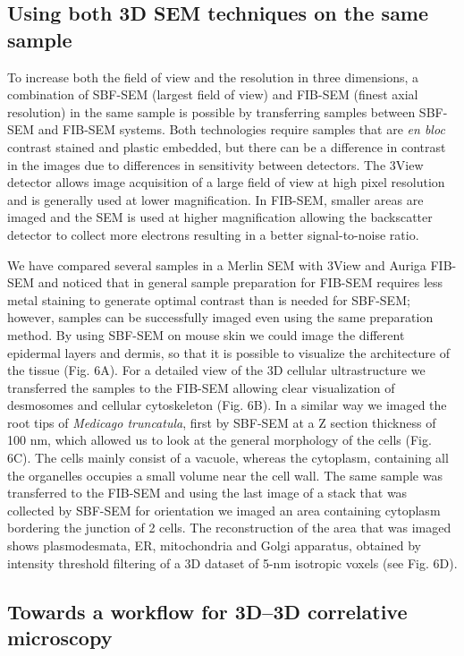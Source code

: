 \documentclass{article}
\begin{document}
\subsection*{Using both 3D SEM techniques on the same sample}

To increase both the field of view and the resolution in three dimensions, a combination of SBF-SEM (largest field of view) and FIB-SEM (finest axial resolution) in the same sample is possible by transferring samples between SBF-SEM and FIB-SEM systems. Both technologies require samples that are \textit{en bloc} contrast stained and plastic embedded, but there can be a difference in contrast in the images due to differences in sensitivity between detectors. The 3View detector allows image acquisition of a large field of view at high pixel resolution and is generally used at lower magnification. In FIB-SEM, smaller areas are imaged and the SEM is used at higher magnification allowing the backscatter detector to collect more electrons resulting in a better signal-to-noise ratio.

We have compared several samples in a Merlin SEM with 3View and Auriga FIB-SEM and noticed that in general sample preparation for FIB-SEM requires less metal staining to generate optimal contrast than is needed for SBF-SEM; however, samples can be successfully imaged even using the same preparation method. By using SBF-SEM on mouse skin we could image the different epidermal layers and dermis, so that it is possible to visualize the architecture of the tissue (Fig. 6A). For a detailed view of the 3D cellular ultrastructure we transferred the samples to the FIB-SEM allowing clear visualization of desmosomes and cellular cytoskeleton (Fig. 6B). In a similar way we imaged the root tips of \textit{Medicago truncatula}, first by SBF-SEM at a Z section thickness of 100 nm, which allowed us to look at the general morphology of the cells (Fig. 6C). The cells mainly consist of a vacuole, whereas the cytoplasm, containing all the organelles occupies a small volume near the cell wall. The same sample was transferred to the FIB-SEM and using the last image of a stack that was collected by SBF-SEM for orientation we imaged an area containing cytoplasm bordering the junction of 2 cells. The reconstruction of the area that was imaged shows plasmodesmata, ER, mitochondria and Golgi apparatus, obtained by intensity threshold filtering of a 3D dataset of 5-nm isotropic voxels (see Fig. 6D).

\subsection*{Towards a workflow for 3D–3D correlative microscopy}
\end{document}
